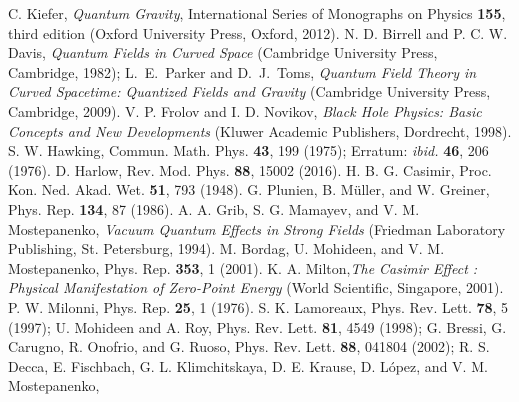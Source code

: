 \documentclass[twocolumn,prd,aps,showpacs,amsmath,amssymb]{revtex4-1}
\begin{document}
\begin{thebibliography}{99}
%
 C. Kiefer, \textit{Quantum Gravity}, International
  Series of Monographs on Physics {\bf 155}, third edition (Oxford
  University Press, Oxford, 2012). 
%
%
 N. D. Birrell and P. C. W. Davis, {\it Quantum Fields
    in Curved Space} (Cambridge University Press, Cambridge, 1982);
  L.~E.~Parker and D.~J.~Toms, {\it Quantum Field Theory in Curved
    Spacetime: Quantized Fields and Gravity} (Cambridge 
  University Press, Cambridge, 2009). 
%
 V. P. Frolov and I. D. Novikov, {\it Black Hole
    Physics: Basic Concepts and New Developments} (Kluwer Academic
  Publishers, Dordrecht, 1998).
%
 S. W. Hawking, Commun. Math. Phys. {\bf 43}, 199
  (1975); Erratum:  {\em ibid.} {\bf 46}, 206 (1976).
%
 D. Harlow, Rev. Mod. Phys. {\bf 88}, 15002 (2016).
%
%
%
%
%
%
 H. B. G. Casimir, Proc. Kon. Ned. Akad. Wet. {\bf 51}, 793 (1948). 
%
 G. Plunien, B. M\"uller, and W. Greiner, Phys. Rep. {\bf 134}, 87 (1986). 
%
 A. A. Grib, S. G. Mamayev, and V. M. Mostepanenko, {\it
    Vacuum Quantum Effects in Strong Fields}  
(Friedman Laboratory Publishing, St. Petersburg, 1994). 
%
 M. Bordag, U. Mohideen, and V. M. Mostepanenko, Phys. Rep. {\bf 353}, 1 (2001). 
%
 K. A. Milton,{\it  The Casimir Effect : Physical
    Manifestation of Zero-Point Energy} 
(World Scientific, Singapore, 2001).
%
 P. W. Milonni, Phys. Rep. {\bf 25}, 1 (1976).
%
 S. K. Lamoreaux, Phys. Rev. Lett. {\bf 78}, 5 (1997); 
U. Mohideen and A. Roy, Phys. Rev. Lett. {\bf 81}, 4549 (1998); 
G. Bressi, G. Carugno, R. Onofrio, and G. Ruoso, Phys. Rev. Lett. {\bf 88}, 041804 (2002); 
R. S. Decca, E. Fischbach, G. L. Klimchitskaya, D. E. Krause, D. L\'opez, and V. M. Mostepanenko, 

\end{thebibliography}
\end{document}
